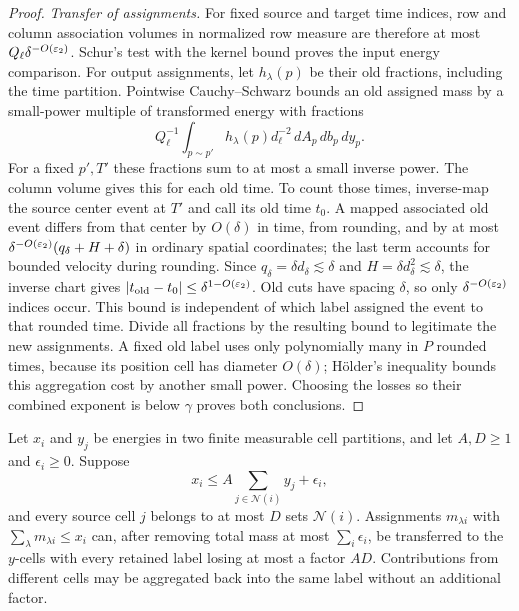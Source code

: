\begin{proof}
\smallskip\noindent
\emph{Transfer of assignments.}
For fixed source and target time indices, row and column association
volumes in normalized row measure are therefore at most
$Q_\ell\delta^{-O(\varepsilon_2)}$.  Schur's test with the kernel bound proves
the input energy comparison.  For output assignments, let
$h_\lambda(p)$ be their old fractions, including the time partition.
Pointwise Cauchy--Schwarz bounds an old assigned mass by a small-power
multiple of transformed energy with fractions
\[
 Q_\ell^{-1}\int_{p\sim p'}h_\lambda(p)
                  d_\ell^{-2}\,dA_p\,db_p\,dy_p.
\]
For a fixed $p',T'$ these fractions sum to at most a small inverse
power.  The column volume gives this for each old time.  To count those
times, inverse-map the source center event at $T'$ and call its old
time $t_0$.  A mapped associated old event differs from that center
by $O(\delta)$ in time, from rounding, and by at most
$\delta^{-O(\varepsilon_2)}(q_\delta+H+\delta)$ in ordinary spatial
coordinates; the last term accounts for bounded velocity during
rounding.  Since $q_\delta=\delta d_\delta\lesssim\delta$ and
$H=\delta d_\delta^2\lesssim\delta$, the inverse chart gives
$|t_{\rm old}-t_0|\le\delta^{1-O(\varepsilon_2)}$.
Old cuts have spacing $\delta$, so only
$\delta^{-O(\varepsilon_2)}$ indices occur.  This bound is independent of
which label assigned the event to that rounded time.
Divide all fractions by the resulting bound to legitimate the new
assignments.  A fixed old label uses only polynomially many in $P$
rounded times, because its position cell has diameter $O(\delta)$;
H\"older's inequality bounds this aggregation cost by another small
power.  Choosing the losses so their combined exponent is below
$\gamma$ proves both conclusions.
\end{proof}

\begin{lemma}\label{rt:capacity}
Let $x_i$ and $y_j$ be energies in two finite measurable cell partitions,
and let $A,D\ge1$ and $\epsilon_i\ge0$.
Suppose
\[
 x_i\le A\sum_{j\in\mathcal N(i)}y_j+\epsilon_i,
\]
and every source cell $j$ belongs to at most $D$ sets $\mathcal N(i)$.
Assignments $m_{\lambda i}$ with $\sum_\lambda m_{\lambda i}\le x_i$
can, after removing total mass at most $\sum_i\epsilon_i$, be
transferred to the $y$-cells with every retained label losing at most
a factor $AD$.  Contributions from different cells may be aggregated
back into the same label without an additional factor.
\end{lemma}

